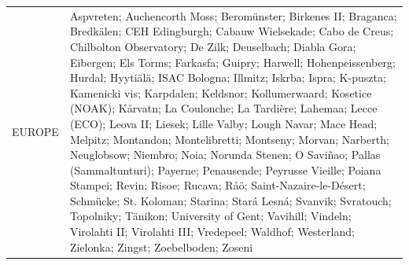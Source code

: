 \documentclass[journal abbreviation, manuscript]{copernicus}
\begin{document}
\begin{table}
\begin{tabularx}{\textwidth}{lX}
  EUROPE   & Aspvreten; Auchencorth Moss; Beromünster; Birkenes II; Braganca; Bredkälen; CEH Edingburgh; Cabauw Wielsekade; Cabo de Creus; Chilbolton Observatory; De Zilk; Deuselbach; Diabla Gora; Eibergen; Els Torms; Farkasfa; Guipry; Harwell; Hohenpeissenberg; Hurdal; Hyytiälä; ISAC Bologna; Illmitz; Iskrba; Ispra; K-puszta; Kamenicki vis; Karpdalen; Keldsnor; Kollumerwaard; Kosetice (NOAK); Kårvatn; La Coulonche; La Tardière; Lahemaa; Lecce (ECO); Leova II; Liesek; Lille Valby; Lough Navar; Mace Head; Melpitz; Montandon; Montelibretti; Montseny; Morvan; Narberth; Neuglobsow; Niembro; Noia; Norunda Stenen; O Saviñao; Pallas (Sammaltunturi); Payerne; Penausende; Peyrusse Vieille; Poiana Stampei; Revin; Risoe; Rucava; Råö; Saint-Nazaire-le-Désert; Schmücke; St. Koloman; Starina; Stará Lesná; Svanvik; Svratouch; Topolniky; Tänikon; University of Gent; Vavihill; Vindeln; Virolahti II; Virolahti III; Vredepeel; Waldhof; Westerland; Zielonka; Zingst; Zoebelboden; Zoseni                                                                                                                                                                                                                                                                                                                                                                                                                                                                                                                                                                                                                                                                                                                                                                                                                                                                                                                                                                                                         \\

\end{tabularx}
\end{table}
\end{document}
